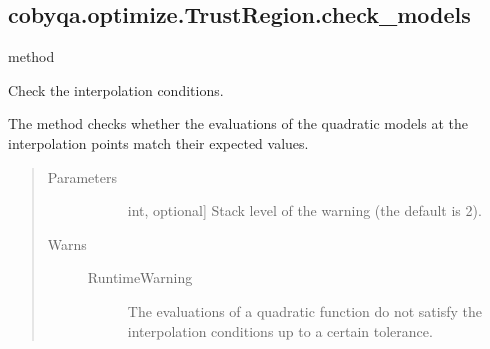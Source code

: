\documentclass[letterpaper,10pt,english]{sphinxmanual}
\begin{document}
\begin{fulllineitems}
\begin{fulllineitems}
\begin{quote}
\begin{description}
\begin{description}
\end{description}

\end{description}\end{quote}

\end{fulllineitems}



\subsection{cobyqa.optimize.TrustRegion.check\_models}
\label{\detokenize{refs/generated/cobyqa.optimize.TrustRegion.check_models:cobyqa-optimize-trustregion-check-models}}\label{\detokenize{refs/generated/cobyqa.optimize.TrustRegion.check_models::doc}}
\sphinxAtStartPar
method

\begin{fulllineitems}
\label{\detokenize{refs/generated/cobyqa.optimize.TrustRegion.check_models:cobyqa.optimize.TrustRegion.check_models}}
\sphinxAtStartPar
Check the interpolation conditions.

\sphinxAtStartPar
The method checks whether the evaluations of the quadratic models at the
interpolation points match their expected values.
\begin{quote}\begin{description}
\item[{Parameters}] \leavevmode\begin{description}
\item[{}] \leavevmode{[}int, optional{]}
\sphinxAtStartPar
Stack level of the warning (the default is 2).

\end{description}

\item[{Warns}] \leavevmode\begin{description}
\item[{RuntimeWarning}] \leavevmode
\sphinxAtStartPar
The evaluations of a quadratic function do not satisfy the
interpolation conditions up to a certain tolerance.

\end{description}


\end{description}
\end{quote}
\end{fulllineitems}
\end{fulllineitems}
\end{document}
